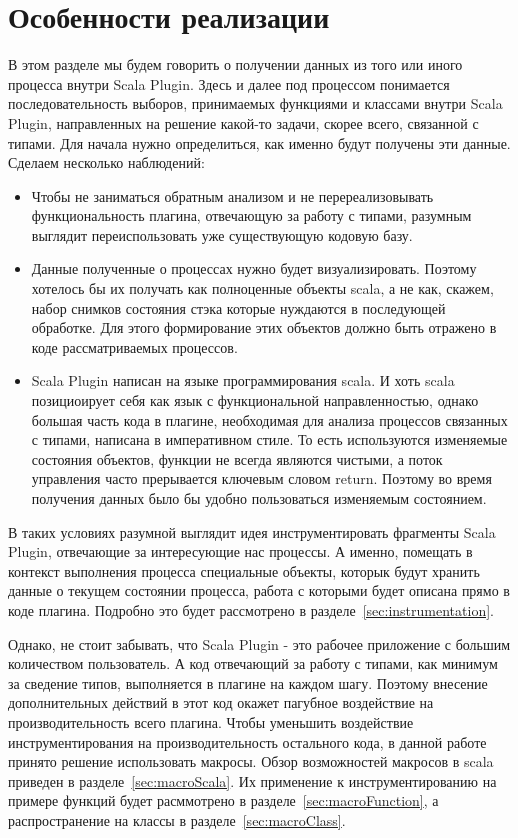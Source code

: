 \section{Особенности реализации}
\label{sec:features}
В этом разделе мы будем говорить о получении данных из того или иного процесса
внутри Scala Plugin.
Здесь и далее под процессом понимается последовательность выборов, принимаемых функциями и
классами внутри Scala Plugin, направленных на решение какой-то задачи, скорее
всего, связанной с типами.
Для начала нужно определиться, как именно будут получены эти данные.
Сделаем несколько наблюдений:

\begin{itemize}
  \item Чтобы не заниматься обратным анализом и не перереализовывать функциональность плагина,
  отвечающую за работу с типами, разумным выглядит переиспользовать уже существующую кодовую базу.
  \item Данные полученные о процессах нужно будет визуализировать.
  Поэтому хотелось бы их получать как полноценные объекты scala, а не как, скажем,
  набор снимков состояния стэка которые нуждаются в последующей обработке.
  Для этого формирование этих объектов должно быть отражено в коде рассматриваемых процессов.
  \item Scala Plugin написан на языке программирования scala.
  И хоть scala позициоирует себя как язык с функциональной направленностью,
  однако большая часть кода в плагине, необходимая для анализа процессов связанных с типами,
  написана в императивном стиле.
  То есть используются изменяемые состояния объектов, функции не всегда являются чистыми,
  а поток управления часто прерывается ключевым словом return.
  Поэтому во время получения данных было бы удобно пользоваться изменяемым состоянием.
\end{itemize}

В таких условиях разумной выглядит идея инструментировать фрагменты Scala Plugin,
отвечающие за интересующие нас процессы.
А именно, помещать в контекст выполнения процесса специальные объекты,
которык будут хранить данные о текущем состоянии процесса,
работа с которыми будет описана прямо в коде плагина.
Подробно это будет рассмотрено в разделе~\ref{sec:instrumentation}.

Однако, не стоит забывать, что Scala Plugin - это рабочее приложение
с большим количеством пользователь.
А код отвечающий за работу с типами, как минимум за сведение типов,
выполняется в плагине на каждом шагу.
Поэтому внесение дополнительных действий в этот код окажет пагубное воздействие
на производительность всего плагина.
Чтобы уменьшить воздействие инструментирования на производительность остального кода,
в данной работе принято решение использовать макросы.
Обзор возможностей макросов в scala приведен в разделе~\ref{sec:macroScala}.
Их применение к инструментированию на примере функций будет расммотрено в
разделе~\ref{sec:macroFunction}, а распространение на классы
в разделе~\ref{sec:macroClass}.

